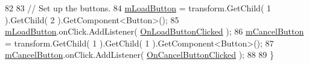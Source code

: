 \begin{DoxyCode}
82 
83         \textcolor{comment}{// Set up the buttons.}
84         \hyperlink{group___s_c___l_s_d_priv_var_gaa27cfb6231ef826024dd063828efa364}{mLoadButton} = transform.GetChild( 1 ).GetChild( 2 ).GetComponent<Button>();
85         \hyperlink{group___s_c___l_s_d_priv_var_gaa27cfb6231ef826024dd063828efa364}{mLoadButton}.onClick.AddListener( \hyperlink{group___s_c___l_s_d_handlers_gad6ab852f2ac019395482e8c836061639}{OnLoadButtonClicked} );
86         \hyperlink{group___s_c___l_s_d_priv_var_ga31e17d7ca1cb32f0ad75ef8c7235873f}{mCancelButton} = transform.GetChild( 1 ).GetChild( 1 ).GetComponent<Button>();
87         \hyperlink{group___s_c___l_s_d_priv_var_ga31e17d7ca1cb32f0ad75ef8c7235873f}{mCancelButton}.onClick.AddListener( \hyperlink{group___s_c___l_s_d_handlers_gae393a24bbdd4fa1d2b45fa4199fb453a}{OnCancelButtonClicked} );
88 
89     \}
\end{DoxyCode}
